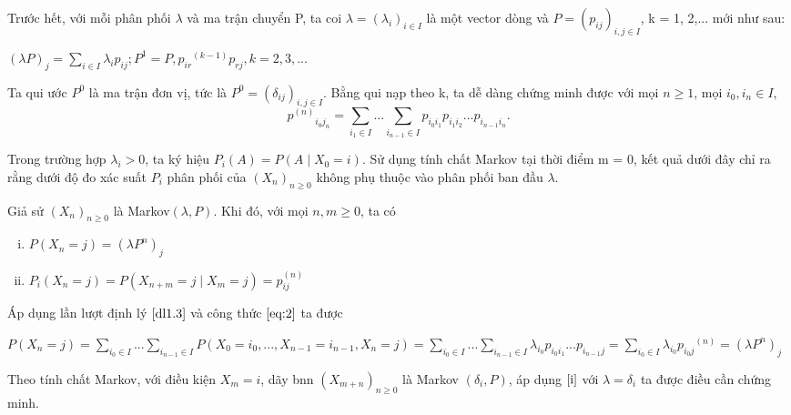 Trước hết, với mỗi phân phối $\lambda$ và ma trận chuyển P, ta coi $\lambda = (\lambda_i)_{i \in I}$ là một vector dòng và $P=(p_{ij})_{i, j \in I}$, k = 1, 2,... mới như sau:
\begin{center}
$(\lambda P)_j =\sum_{i \in I}{\lambda_i p_{ij}}; P^1 = P, {p_{ir}}^{(k-1)}p_{rj}, k=2, 3,...$ 
\end{center}
Ta qui ước $P^0$ là ma trận đơn vị, tức là $P^0 = (\delta_{ij})_{i, j \in I}$. Bằng qui nạp theo k, ta dễ dàng chứng minh được với mọi $n\geq 1$, mọi $i_0, i_n \in I$,
\begin{equation}\label{eq:2}
{p^{(n)}}_{i_0 j_n} = \sum_{i_1 \in I}{...\sum_{i_{n-1} \in I}{p_{i_0 i_1}p_{i_1 i_2}...p_{i_{n-1}i_n}}}.
\end{equation}

Trong trường hợp $\lambda_i > 0$, ta ký hiệu $P_i(A) = P(A\mid X_0 = i).$ Sử dụng tính chất Markov tại thời điểm m = 0, kết quả dưới đây chỉ ra rằng dưới độ đo xác suất $P_i$ phân phối của $(X_n)_{n \geq 0}$ không phụ thuộc vào phân phối ban đầu $\lambda$.
\hdn

\dl
Giả sử $(X_n)_{n\geq 0}$ là Markov$(\lambda,P)$. Khi đó, với mọi $n,m \geq 0$, ta có
\begin{enumerate}[i)]
\item\label{i} $P(X_n = j) = (\lambda P^n)_j$
\item $P_i(X_n=j) = P(X_{n+m} = j \mid X_m=j) = {p_{ij}^{(n)}}$
\end{enumerate}
\cm
Áp dụng lần lượt định lý $\eqref{dl1.3}$ và công thức $\eqref{eq:2}$ ta được
\begin{center}
$P(X_n = j) = \sum_{i_0 \in I}{...\sum_{i_{n-1} \in I}{P(X_0=i_0,...,X_{n-1}=i_{n-1}, X_n=j)}} = \sum_{i_0 \in I}{...\sum_{i_{n-1}\in I}}{\lambda_{i_0}p_{i_0 i_1} ... p_{i_{n-1}j}} = \sum_{i_0 \in I}{\lambda_{i_0}{p_{i_0 j}}^{(n)}} = (\lambda P^n)_j$
\end{center}
Theo tính chất Markov, với điều kiện $X_m = i$, dãy bnn $(X_{m+n})_{n\geq 0}$ là Markov $(\delta_i, P)$, áp dụng $\eqref{i}$ với $\lambda = \delta_i$ ta được điều cần chứng minh.

